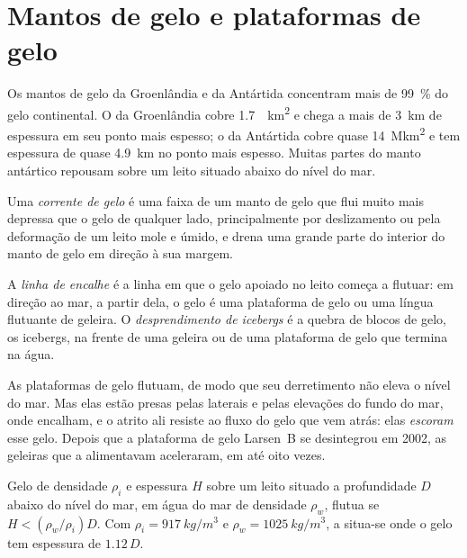 \section{Mantos de gelo e plataformas de gelo}\label{sec:b3:glaciology:ice-sheets}

Os mantos de gelo da Groenlândia e da Antártida concentram mais de
\qty{99}{\percent} do gelo continental. O da Groenlândia cobre \qty{1.7}{\mega
km^2} e chega a mais de \qty{3}{km} de espessura em seu ponto mais espesso; o da Antártida cobre
quase \qty{14}{\mega km^2} e tem espessura de quase \qty{4.9}{km} no ponto mais espesso. Muitas
partes do manto antártico repousam sobre um leito situado abaixo do nível do mar.

\begin{definition}\label{def:b3:glaciology:ice-stream}
Uma \emph{corrente de gelo} é uma faixa de um manto de gelo que flui
muito mais depressa que o gelo de qualquer lado, principalmente por deslizamento ou pela
deformação de um leito mole e úmido, e drena uma grande parte do
interior do manto de gelo em direção à sua margem.
\end{definition}

\begin{definition}\label{def:b3:glaciology:grounding-line}
A \emph{linha de encalhe} é a linha em que o gelo
apoiado no leito começa a flutuar: em direção ao mar, a partir dela, o gelo é uma
plataforma de gelo ou uma língua flutuante de geleira. O \emph{desprendimento de icebergs} é a quebra
de blocos de gelo, os icebergs, na frente de uma geleira ou de uma plataforma de gelo
que termina na água.
\end{definition}

As plataformas de gelo flutuam, de modo que seu derretimento não eleva o nível do mar. Mas elas estão
presas pelas laterais e pelas elevações do fundo do mar, onde
encalham, e o atrito ali resiste ao fluxo do gelo que vem atrás: elas
\emph{escoram} esse gelo. Depois que a plataforma de gelo Larsen~B se desintegrou em 2002, as
geleiras que a alimentavam aceleraram, em até oito vezes.

\begin{proposition}[Flutuação]\label{prop:b3:glaciology:flotation}
Gelo de densidade $\rho_i$ e espessura $H$ sobre um leito situado a profundidade $D$ abaixo do
nível do mar, em água do mar de densidade $\rho_w$, flutua se $H < (\rho_w/\rho_i)D$.
Com $\rho_i = \qty{917}{kg/m^3}$ e $\rho_w = \qty{1025}{kg/m^3}$, a
 situa-se onde o gelo tem espessura de $1.12\,D$.
\end{proposition}

